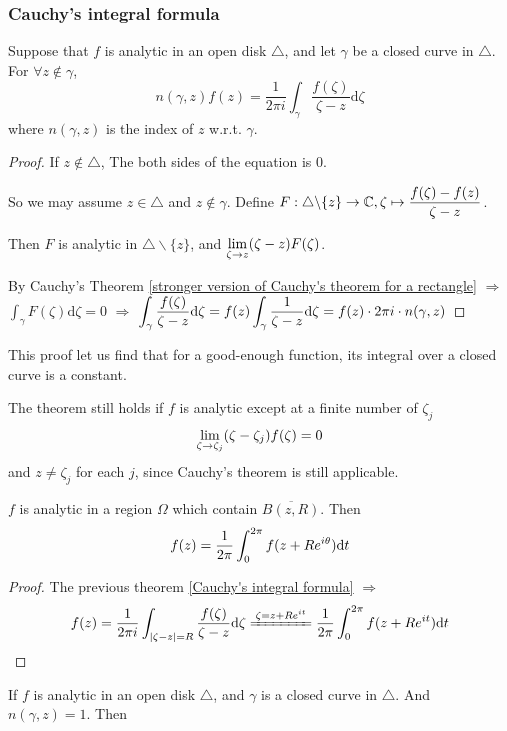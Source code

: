 \subsubsection{Cauchy's integral formula}
\begin{theorem}\label{Cauchy's integral formula}
    Suppose that  $ f $ is analytic in an open disk  $ \triangle $, and let  $ \gamma $ be a closed curve in  $ \triangle $. For  $ \forall z\not\in \gamma $,
    \[n(\gamma,z)f(z)=\frac{1}{2\pi i}\int_\gamma \frac{f(\zeta)}{\zeta-z}\mathrm{d}\zeta\]
    where  $ n(\gamma,z) $ is the index of  $ z  $ w.r.t.  $ \gamma $.        
\end{theorem}
\begin{proof}
    If  $ z\not\in \triangle $, The both sides of the equation is  $ 0 $.
    
    So we may assume  $ z\in \triangle $ and  $ z\not\in \gamma $. Define  $ F:\triangle\backslash\{z\}\rightarrow \mathbb{C},\zeta\mapsto \displaystyle\frac{f(\zeta)-f(z)}{\zeta-z} $.
    
    Then  $ F $ is analytic in  $ \triangle\backslash\{z\} $, and  $ \displaystyle\lim\limits_{\zeta\to z}(\zeta-z)F(\zeta) $.
    
    By Cauchy's Theorem \ref{stronger version of Cauchy's theorem for a rectangle} $ \Rightarrow $ $ \int_\gamma F(\zeta)\mathrm{d}\zeta=0 $  $\Rightarrow $ $ \displaystyle\int_\gamma \frac{f(\zeta)}{\zeta-z}\mathrm{d}\zeta=f(z)\int_\gamma\frac{1}{\zeta-z}\mathrm{d}\zeta=f(z)\cdot 2\pi i \cdot n(\gamma,z) $   
\end{proof}
\begin{remark}\label{Cauch's integral formula Remark}
    This proof let us find that for a good-enough function, its integral over a closed curve is a constant.
    
    The theorem still holds if  $ f $ is analytic except at a finite number of  $ \zeta_j $ \st  \[ \displaystyle\lim\limits_{\zeta\to\zeta_j}(\zeta-\zeta_j)f(\zeta)=0 \] and  $ z\neq\zeta_j $ for each  $ j $,  since Cauchy's theorem is still applicable. 
\end{remark}
\begin{theorem}\label{mean value property}
     $ f $  is analytic in a region $ \Omega $ which contain  $ \overline{B(z,R)} $. Then  \[ f(z)=\displaystyle\frac{1}{2\pi}\int_0^{2\pi}f(z+Re^{i\theta})\mathrm{d}t \]  
\end{theorem}
\begin{proof}
    The previous theorem \ref{Cauchy's integral formula} $ \Rightarrow  $ \[ \dps f(z)=\frac{1}{2\pi i}\int_{|\zeta-z|=R}\frac{f(\zeta)}{\zeta-z}\mathrm{d}\zeta\xlongequal{\zeta=z+Re^{it}}\frac{1}{2\pi}\int_0^{2\pi} f(z+Re^{it})\mathrm{d}t \]
\end{proof}
If  $ f $ is analytic in an open disk $ \triangle $, and  $ \gamma $ is a closed curve in  $ \triangle $. And  $ n(\gamma,z)=1$. Then 

